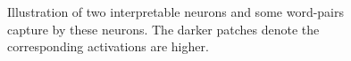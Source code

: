 \documentclass{article}
\begin{document}






\begin{figure}[t]\centering

  \hspace{0.3cm}

  \caption{Illustration of two interpretable neurons and some word-pairs capture by these neurons. The darker patches denote the corresponding activations are higher.}\label{fig:case-studt}
\end{figure}
\end{document}
